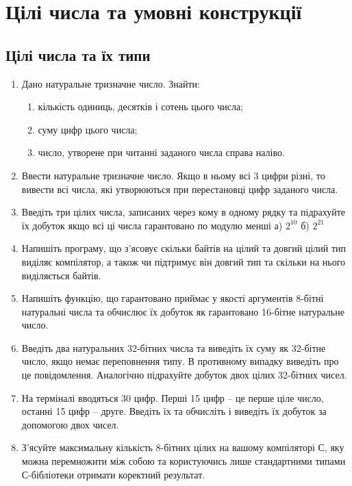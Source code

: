\documentclass[]{article}
\makeatletter
\newcommand{\xslalph}[1]{\expandafter\@xslalph\csname c@#1\endcsname}
\newcommand{\@xslalph}[1]{%
    \ifcase#1\or а\or б\or в\or г\or д\or e\or є\or ж\or з\or i%
    \or й\or к\or л\or м\or н\or о\or п\or р\or с\or т%
    \or у\or ф\or х\or ц\or ч\or ш\or ю\or я\or аа\or бб\or вв %
    \else\@ctrerr\fi%
}
\makeatother
\begin{document}
\section{Цілі числа та умовні конструкції}

\subsection {Цілі числа та їх типи}
\begin{enumerate}
\item
Дано натуральне тризначне число. Знайти:
  \begin{enumerate}[label=\xslalph*)]
\item кількість одиниць, десятків і сотень цього числа;
\item суму цифр цього числа;
\item число, утворене при читанні заданого числа справа наліво.
\end{enumerate}
\item
Ввести натуральне тризначне число. Якщо в ньому всі 3 цифри різні, то
вивести всі числа, які утворюються при перестановці цифр заданого числа.
\item
Введіть три цілих числа, записаних через кому в одному рядку та
підрахуйте їх добуток якщо всі ці числа гарантовано по модулю менші а)
\(2^{10}\) б) \(2^{21}\)

\item
Напишіть програму, що з'ясовує скільки байтів на цілий та довгий цілий
тип виділяє компілятор, а також чи підтримує він довгий тип та скільки
на нього виділяється байтів.
\item
Напишіть функцію, що гарантовано приймає у якості аргументів 8-бітні
натуральні числа та обчислює їх добуток як гарантовано 16-бітне
натуральне число.
\item
 Введіть два натуральних 32-бітних числа та виведіть їх суму як
  32-бітне число, якщо немає переповнення типу. В противному випадку
  виведіть про це повідомлення. Аналогічно підрахуйте добуток двох цілих
  32-бітних чисел.
\item
На терміналі вводяться 30 цифр. Перші 15 цифр -- це перше ціле число,
останні 15 цифр -- друге. Введіть їх та обчисліть і виведіть їх добуток
за допомогою двох чисел.
\item
З'ясуйте максимальну кількість 8-бітних цілих на вашому компіляторі С, яку
можна перемножити між собою та користуючись лише стандартними типами
С-бібліотеки отримати коректний результат.
\end{enumerate}
\end{document}
